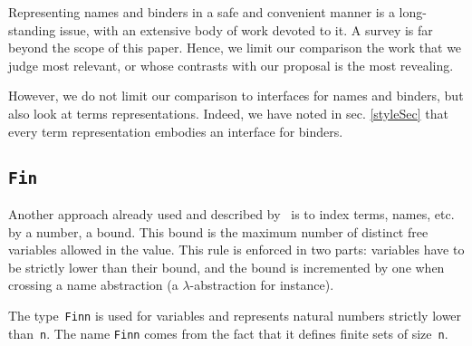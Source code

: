 \documentclass[9pt,preprint,authoryear]{sigplanconf}
\begin{document}
%
Representing names and binders in a safe and convenient manner is
   a long-standing issue, with an extensive body of work devoted to it.
   A survey is far beyond the scope of this paper.
   Hence, we limit our comparison the work that we judge most relevant, 
   or whose contrasts with our proposal is the most revealing.


%
However, we do not limit our comparison to interfaces for names and
    binders, but also look at terms representations. Indeed, we have 
    noted in sec. \ref{styleSec} that every term representation embodies
    an interface for binders.%


\subsection{\textcolor[rgb]{0,0,0.80}{\texttt{Fin}}}

%
Another approach already used and described by{~}\citet{altenkirch-93,mcbride-mckinna-04} is
    to index terms, names, etc. by a number, a bound. This bound is the
    maximum number of distinct free variables allowed in the value. This
    rule is enforced in two parts{:} variables have to be strictly lower
    than their bound, and the bound is incremented by one when crossing
    a name abstraction (a $ \lambda $-abstraction for instance).%


%
The type{~}\textcolor[rgb]{0,0,0.80}{\texttt{Fin}}\textcolor[rgb]{0,0,0.80}{\texttt{\mbox{\hspace{0.50em}}}}\textcolor[rgb]{0,0,0.80}{\texttt{n}} is used for variables and represents natural
    numbers strictly lower than{~}\textcolor[rgb]{0,0,0.80}{\texttt{n}}. The name \textcolor[rgb]{0,0,0.80}{\texttt{Fin}}\textcolor[rgb]{0,0,0.80}{\texttt{\mbox{\hspace{0.50em}}}}\textcolor[rgb]{0,0,0.80}{\texttt{n}} comes from the
    fact that it defines finite sets of size{~}\textcolor[rgb]{0,0,0.80}{\texttt{n}}.%
\end{document}
